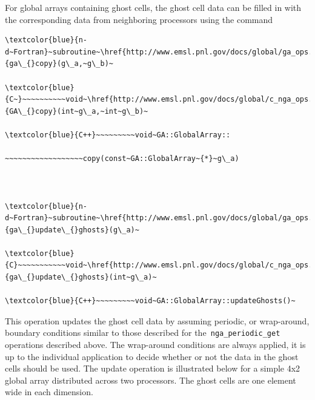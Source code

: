 For global arrays containing ghost cells, the ghost cell data can
be filled in with the corresponding data from neighboring processors
using the command
\begin{verbatim}
\textcolor{blue}{n-d~Fortran}~subroutine~\href{http://www.emsl.pnl.gov/docs/global/ga_ops.html\#ga_copy}{ga\_{}copy}(g\_a,~g\_b)~

\textcolor{blue}{C~}~~~~~~~~~~void~\href{http://www.emsl.pnl.gov/docs/global/c_nga_ops.html\#ga_copy}{GA\_{}copy}(int~g\_a,~int~g\_b)~

\textcolor{blue}{C++}~~~~~~~~~void~GA::GlobalArray::

~~~~~~~~~~~~~~~~~~copy(const~GA::GlobalArray~{*}~g\_a)



\textcolor{blue}{n-d~Fortran}~subroutine~\href{http://www.emsl.pnl.gov/docs/global/ga_ops.html\#ga_update_ghosts}{ga\_{}update\_{}ghosts}(g\_a)~

\textcolor{blue}{C}~~~~~~~~~~~void~\href{http://www.emsl.pnl.gov/docs/global/c_nga_ops.html\#ga_update_ghosts}{ga\_{}update\_{}ghosts}(int~g\_a)~

\textcolor{blue}{C++}~~~~~~~~~void~GA::GlobalArray::updateGhosts()~
\end{verbatim}
This operation updates the ghost cell data by assuming periodic, or
wrap-around, boundary conditions similar to those described for the\texttt{
nga\_periodic\_get} operations described above. The wrap-around conditions
are always applied, it is up to the individual application to decide
whether or not the data in the ghost cells should be used. The update
operation is illustrated below for a simple 4x2 global array distributed
across two processors. The ghost cells are one element wide in each
dimension.

